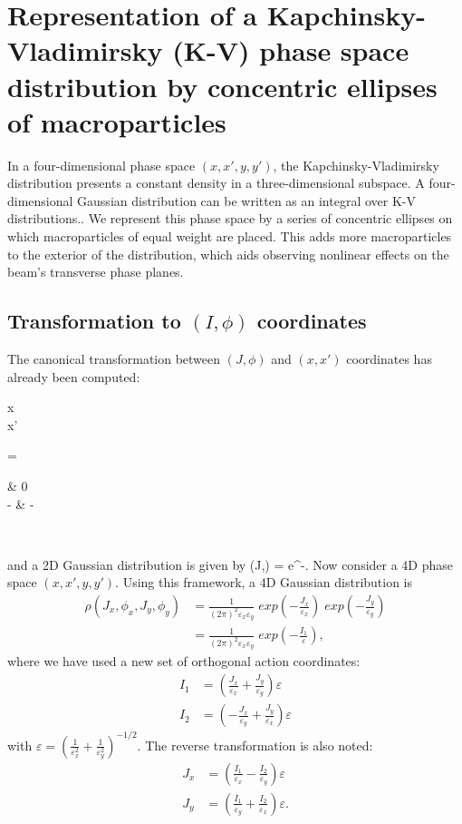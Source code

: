 \chapter{Representation of a Kapchinsky-Vladimirsky (K-V) phase space distribution by concentric ellipses of macroparticles}

In a four-dimensional phase space $(x,x',y,y')$, the Kapchinsky-Vladimirsky distribution presents a constant density in a three-dimensional subspace.  A four-dimensional Gaussian distribution can be written as an integral over K-V distributions..  We represent this phase space by a series of concentric ellipses on which macroparticles of equal weight are placed.  This adds more macroparticles to the exterior of the distribution, which aids observing nonlinear effects on the beam's transverse phase planes.

\section{Transformation to $(I,\phi)$ coordinates}
The canonical transformation between $(J,\phi)$ and $(x,x')$ coordinates has already been computed:
\Begineq
	\begin{pmatrix} x \\ x' \end{pmatrix}
	=  
	\begin{pmatrix} \sqrt{\beta} & 0 \\ -\frac{\alpha}{\sqrt{\beta}} & - \end{pmatrix}
	\begin{pmatrix} \cos\phi \\ \sin\phi \end{pmatrix}
\Endeq
and a 2D Gaussian distribution is given by
\Begineq
	\rho(J,\phi) =  e^{-}.
\Endeq
Now consider a 4D phase space $(x,x',y,y')$.  Using this framework, a 4D Gaussian distribution is
\begin{align}
	\rho(J_x,\phi_x,J_y,\phi_y) & = \frac{1}{(2\pi)^2 \varepsilon_x \varepsilon_y}\; exp(-\frac{J_x}{\varepsilon_x})\; exp(-\frac{J_y}{\varepsilon_y}) \\
	                            & = \frac{1}{(2\pi)^2 \varepsilon_x \varepsilon_y}\; exp(-\frac{I_1}{\varepsilon}),
\end{align}
where we have used a new set of orthogonal action coordinates:
\begin{align}
	I_1 & = \left( \frac{J_x}{\varepsilon_x} + \frac{J_y}{\varepsilon_y} \right) \varepsilon  \\
	I_2 & = \left( -\frac{J_x}{\varepsilon_y} + \frac{J_y}{\varepsilon_x} \right) \varepsilon
\end{align}
with $\varepsilon = (\frac{1}{\varepsilon_x^2} + \frac{1}{\varepsilon_y^2})^{-1/2}$.  The reverse transformation is also noted:
\begin{align}
	J_x & = \left( \frac{I_1}{\varepsilon_x} - \frac{I_2}{\varepsilon_y} \right) \varepsilon  \\
	J_y & = \left( \frac{I_1}{\varepsilon_y} + \frac{I_2}{\varepsilon_x} \right) \varepsilon.
\end{align}

